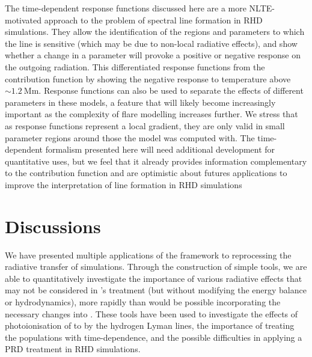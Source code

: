 The time-dependent response functions discussed here are a more NLTE-motivated approach to the problem of spectral line formation in RHD simulations.
They allow the identification of the regions and parameters to which the line is sensitive (which may be due to non-local radiative effects), and show whether a change in a parameter will provoke a positive or negative response on the outgoing radiation.
This differentiated response functions from the contribution function by showing the negative response to temperature above $\sim\SI{1.2}{\mega\m}$.
Response functions can also be used to separate the effects of different parameters in these models, a feature that will likely become increasingly important as the complexity of flare modelling increases further.
We stress that as response functions represent a local gradient, they are only valid in small parameter regions around those the model was computed with.
The time-dependent formalism presented here will need additional development for quantitative uses, but we feel that it already provides information complementary to the contribution function and are optimistic about futures applications to improve the interpretation of line formation in RHD simulations

\section{Discussions}

We have presented multiple applications of the \Lw{} framework to reprocessing the radiative transfer of \Radyn{} simulations.
Through the construction of simple tools, we are able to quantitatively investigate the importance of various radiative effects that may not be considered in \Radyn{}'s treatment (but without modifying the energy balance or hydrodynamics), more rapidly than would be possible incorporating the necessary changes into \Radyn{}.
These tools have been used to investigate the effects of photoionisation of \Caii{} to \Caiii{} by the hydrogen Lyman lines, the importance of treating the \Caii{} populations with time-dependence, and the possible difficulties in applying a PRD treatment in RHD simulations.

